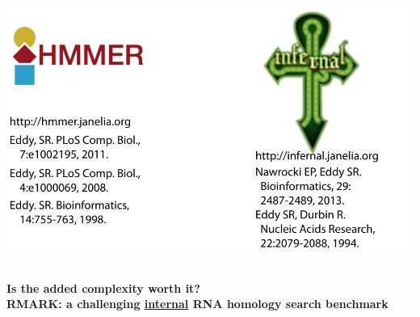 \documentclass[landscape]{slides}
\begin{document}
\begin{slide}
\begin{slide}
\begin{center}
\hspace{2.2in}\includegraphics[height=3.5in]{figs/hmmer-infernal-refs-2015}

\end{center}

\vfill

\end{slide}

\begin{slide}
\begin{center}
\textbf{Is the added complexity worth it? \\
  RMARK: a challenging \underline{internal} RNA homology search
  benchmark}


\end{center}
\end{slide}
\end{slide}
\end{document}
